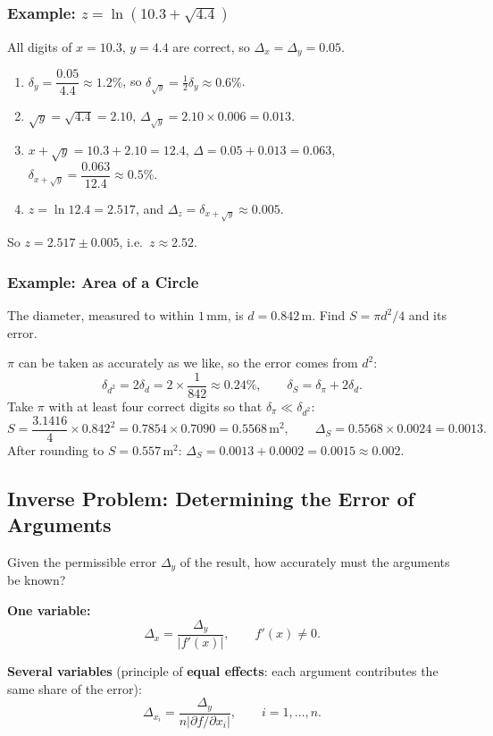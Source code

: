 \documentclass[hidelinks]{article}
\newcommand{\abs}[1]{\left|#1\right|}
\begin{document}
\subsubsection{Example: $z=\ln(10.3+\sqrt{4.4})$}

All digits of $x=10.3$, $y=4.4$ are correct, so $\Delta_x=\Delta_y=0.05$.
\begin{enumerate}
    \item $\delta_y=\dfrac{0.05}{4.4}\approx1.2\%$, so $\delta_{\sqrt y}=\tfrac12\delta_y\approx0.6\%$.
    \item $\sqrt y=\sqrt{4.4}=2.10$, $\Delta_{\sqrt y}=2.10\times0.006=0.013$.
    \item $x+\sqrt y=10.3+2.10=12.4$, $\Delta=0.05+0.013=0.063$, $\delta_{x+\sqrt y}=\dfrac{0.063}{12.4}\approx0.5\%$.
    \item $z=\ln12.4=2.517$, and $\Delta_z=\delta_{x+\sqrt y}\approx0.005$.
\end{enumerate}
So $z=2.517\pm0.005$, i.e.\ $z\approx2.52$.

\subsubsection{Example: Area of a Circle}

The diameter, measured to within $1$\,mm, is $d=0.842$\,m. Find $S=\pi d^2/4$ and its error.

$\pi$ can be taken as accurately as we like, so the error comes from $d^2$:
\[
\delta_{d^2}=2\delta_d=2\times\frac{1}{842}\approx0.24\%,\qquad \delta_S=\delta_{\pi}+2\delta_d .
\]
Take $\pi$ with at least four correct digits so that $\delta_\pi\ll\delta_{d^2}$:
\[
S=\frac{3.1416}{4}\times0.842^2=0.7854\times0.7090=0.5568\,\text{m}^2,\qquad
\Delta_S=0.5568\times0.0024=0.0013.
\]
After rounding to $S=0.557\,\text{m}^2$: $\Delta_S=0.0013+0.0002=0.0015\approx0.002$.

\subsection{Inverse Problem: Determining the Error of Arguments}

Given the permissible error $\Delta_y$ of the result, how accurately must the arguments be known?

\textbf{One variable:}
\[
\Delta_x=\frac{\Delta_y}{\abs{f'(x)}},\qquad f'(x)\neq0.
\]

\textbf{Several variables} (principle of \textbf{equal effects}: each argument contributes the same share of the error):
\[
\Delta_{x_i}=\frac{\Delta_y}{n\abs{\partial f/\partial x_i}},\qquad i=1,\dots,n.
\]
\end{document}
